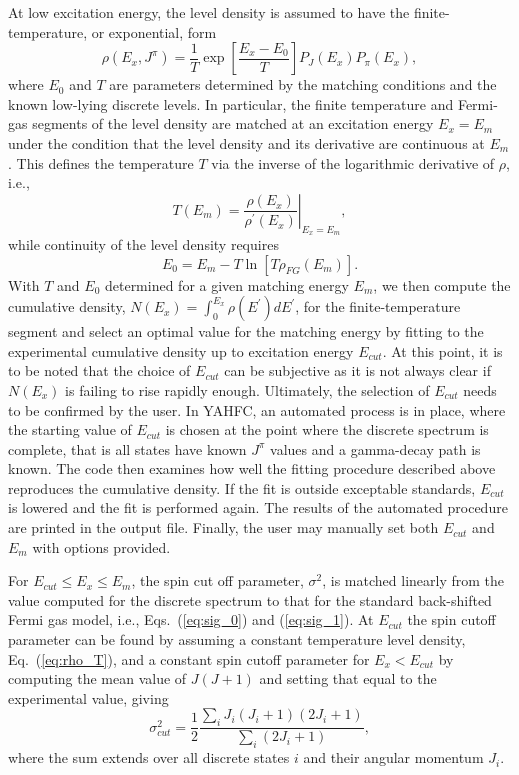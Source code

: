 \documentclass[
10pt,
showpacs,preprintnumbers,footinbib,
amsfonts,amsmath,amssymb,
aps,
prc,twocolumn,groupedaddress,superscriptaddress,
showkeys,
nofootinbib
]{revtex4-1}
\begin{document}
At low excitation energy, the level density is assumed to have the finite-temperature, or exponential, form
\begin{equation}
\rho(E_x,J^\pi) = \frac{1}{T}\exp\left [ \frac{E_x - E_0}{T}\right ] P_J(E_x) P_\pi(E_x),
\label{eq:rho_T}
\end{equation}
where $E_0$ and $T$ are parameters determined by the matching conditions and the known low-lying discrete levels. In particular, the finite temperature and Fermi-gas segments of the level density are matched at an excitation energy $E_x=E_m$ under the condition that the level density and its derivative are continuous at $E_m$. This defines the temperature $T$ via the inverse of the logarithmic derivative of $\rho$, i.e.,
\begin{equation}
T(E_m) = \left. \frac{\rho(E_x)}{\rho^\prime(E_x)} \right |_{E_x = E_m},
\end{equation}
while continuity of the level density requires
\begin{equation}
E_0 = E_m -T\ln\left [ T\rho_{FG}(E_m)\right].
\end{equation}
With $T$ and $E_0$ determined for a given matching energy $E_m$, we then compute the cumulative density, $N(E_x) = \int_0^{E_x} \rho(E^\prime)dE^\prime$, for the finite-temperature segment and select an optimal value for the matching energy by fitting to the experimental cumulative density up to excitation energy $E_{cut}$. At this point, it is to be noted that the choice of $E_{cut}$ can be subjective as it is not always clear if $N(E_x)$ is failing to rise rapidly enough. Ultimately, the selection of $E_{cut}$ needs to be confirmed by the user. In YAHFC, an automated process is in place, where the starting value of $E_{cut}$ is chosen at the point where the discrete spectrum is complete, that is all states have known $J^\pi$ values and a gamma-decay path is known. The code then examines how well the fitting procedure described above reproduces the cumulative density. If the fit is outside exceptable standards, $E_{cut}$ is lowered and the fit is performed again. The results of the automated procedure are printed in the output file. Finally, the user may manually set both $E_{cut}$ and $E_m$ with options provided.

For $E_{cut} \le E_x \le E_m$, the spin cut off parameter, $\sigma^2$, is matched linearly from the value computed for the discrete spectrum to that for the standard back-shifted Fermi gas model, i.e., Eqs.~(\ref{eq:sig_0}) and (\ref{eq:sig_1}). At $E_{cut}$ the spin cutoff parameter can be found by assuming a constant temperature level density, Eq.~(\ref{eq:rho_T}), and a constant spin cutoff parameter for $E_x < E_{cut}$ by computing the mean value of $J(J+1)$ and setting that equal to the experimental value, giving
\begin{equation}
\sigma^2_{cut} = \frac{1}{2}\frac{\sum_i J_i(J_i+1)(2J_i+1)}{\sum_i (2J_i+1)},
\end{equation}
where the sum extends over all discrete states $i$ and their angular momentum $J_i$.
\end{document}
